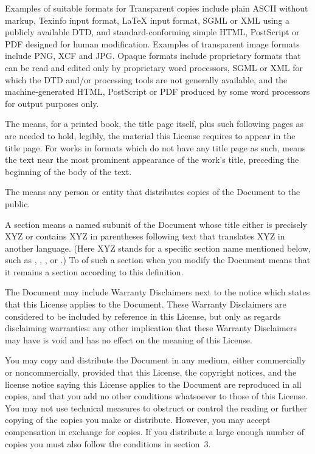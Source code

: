 Examples of suitable formats for Transparent copies include plain
ASCII without markup, Texinfo input format, LaTeX input format, SGML
or XML using a publicly available DTD, and standard-conforming simple
HTML, PostScript or PDF designed for human modification.  Examples of
transparent image formats include PNG, XCF and JPG.  Opaque formats
include proprietary formats that can be read and edited only by
proprietary word processors, SGML or XML for which the DTD and/or
processing tools are not generally available, and the
machine-generated HTML, PostScript or PDF produced by some word
processors for output purposes only.

The  means, for a printed book, the title page itself,
plus such following pages as are needed to hold, legibly, the material
this License requires to appear in the title page.  For works in
formats which do not have any title page as such,  means
the text near the most prominent appearance of the work's title,
preceding the beginning of the body of the text.

The  means any person or entity that distributes
copies of the Document to the public.

A section  means a named subunit of the Document whose
title either is precisely XYZ or contains XYZ in parentheses following
text that translates XYZ in another language.  (Here XYZ stands for a
specific section name mentioned below, such as ,
, , or .)
To 
of such a section when you modify the Document means that it remains a
section  according to this definition.

The Document may include Warranty Disclaimers next to the notice which
states that this License applies to the Document.  These Warranty
Disclaimers are considered to be included by reference in this
License, but only as regards disclaiming warranties: any other
implication that these Warranty Disclaimers may have is void and has
no effect on the meaning of this License.


\stopalignment

You may copy and distribute the Document in any medium, either
commercially or noncommercially, provided that this License, the
copyright notices, and the license notice saying this License applies
to the Document are reproduced in all copies, and that you add no other
conditions whatsoever to those of this License.  You may not use
technical measures to obstruct or control the reading or further
copying of the copies you make or distribute.  However, you may accept
compensation in exchange for copies.  If you distribute a large enough
number of copies you must also follow the conditions in section~3.

